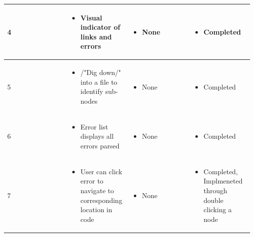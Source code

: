 \documentclass[letterpaper,10pt,titlepage,draftclsnofoot,onecolumn,onesided] {IEEEtran}
\begin{document}
{\begin{center}
\begin{singlespace}
\begin{tabular}{ |  p{0.25\linewidth}  |  p{0.25\linewidth}  | p{0.25\linewidth} | p{0.25\linewidth} |}
        \\ \hline

            4
		& 
			\begin{itemize}
				\item Visual indicator of links and errors
			\end{itemize}
		& 
			\begin{itemize}
				\item None
			\end{itemize}
		&
			\begin{itemize}
				\item Completed
			\end{itemize} 
		
        \\ \hline

        	5
		& 
			\begin{itemize}
				\item /"Dig down/" into a file to identify sub-nodes
			\end{itemize}
		& 
			\begin{itemize}
				\item None
			\end{itemize}
		&
			\begin{itemize}
				\item Completed
			\end{itemize} 
		
        \\ \hline

        	6
		& 
			\begin{itemize}
				\item Error list displays all errors parsed
			\end{itemize}
		& 
			\begin{itemize}
				\item None
			\end{itemize}
		&
			\begin{itemize}
				\item Completed
			\end{itemize} 
		
        \\ \hline

        	7
		& 
			\begin{itemize}
				\item User can click error to navigate to corresponding location in code
			\end{itemize}
		& 
			\begin{itemize}
				\item None
			\end{itemize}
		&
			\begin{itemize}
				\item Completed, Implmeneted through double clicking a node
			\end{itemize} 
		

\end{tabular}
\end{singlespace}
\end{center}}
\end{document}
